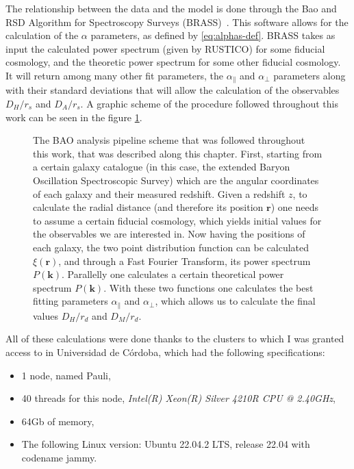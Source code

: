 The relationship between the data and the model is done through the Bao and RSD Algorithm for Spectroscopy Surveys (BRASS)~\cite{brass}. This software allows for the calculation of the $\alpha$ parameters, as defined by \eqref{eq:alphas-def}. BRASS takes as input the calculated power spectrum (given by RUSTICO) for some  fiducial cosmology, and the theoretic power spectrum for some other fiducial cosmology. It will return among many other fit parameters, the $\alpha_\parallel$ and $\alpha_\perp$ parameters along with their standard deviations that will allow the calculation of the observables $D_H/r_s$ and $D_A /r_s$. A graphic scheme of the procedure followed throughout this work can be seen in the figure \ref{fig:pipeline}.\\


\begin{figure}[p]
    \centering
    \caption[The BAO analysis pipeline schematic]{The BAO analysis pipeline scheme that was  followed throughout this work, that was described along this chapter. First, starting from a certain galaxy catalogue (in this case, the extended Baryon Oscillation Spectroscopic Survey) which are the angular coordinates of each galaxy and their measured redshift. Given a redshift $z$, to calculate the radial distance (and therefore its position $\textbf{r}$) one needs to assume a certain fiducial cosmology, which yields initial values for the observables we are interested in. Now having the positions of each galaxy, the two point distribution function can be calculated $\xi(\textbf{r})$, and through a Fast Fourier Transform, its power spectrum $P(\textbf{k})$. Parallelly one calculates a certain theoretical  power spectrum $P(\textbf{k})$. With these two functions one calculates the best fitting parameters $\alpha_\parallel$ and $\alpha_\perp$, which allows us to calculate the final values $D_H /r_d$ and $D_M / r_d$.}
    \label{fig:pipeline}
\end{figure}
All of these calculations were done thanks to the clusters to which I was granted access to in Universidad de Córdoba, which had the following specifications: 
\begin{itemize}
	\item 1 node, named Pauli,
\item 40 threads for this node, \textit{Intel(R) Xeon(R) Silver 4210R CPU @ 2.40GHz},
\item 64Gb of memory,
\item The following Linux version: Ubuntu 22.04.2 LTS, release 22.04 with codename jammy.
\end{itemize}
